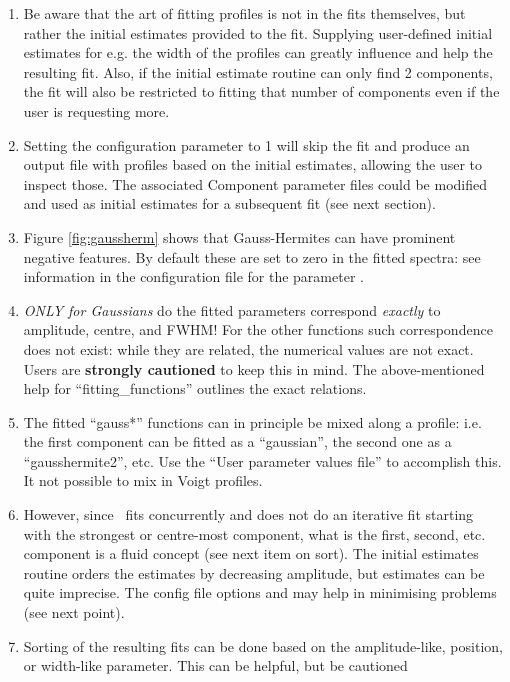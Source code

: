 \documentclass[oneside,11pt]{starlink}
\begin{document}
\begin{enumerate}
\item Be aware that the art of fitting profiles is not in the fits
  themselves, but rather the initial estimates provided to the
  fit. Supplying user-defined initial estimates for e.g. the width of
  the profiles can greatly influence and help the resulting fit. Also, if
  the initial estimate routine can only find 2 components, the fit will
  also be restricted to fitting that number of components even if the
  user is requesting more.
\item Setting the configuration parameter  to 1
  will skip the fit and produce an output file with profiles based on the
  initial estimates, allowing the user to inspect those. The associated
  Component parameter files could be modified and used as initial estimates
  for a subsequent fit (see next section).
\item Figure \ref{fig:gaussherm} shows that Gauss-Hermites can have
  prominent negative features. By default these are set to zero in the
  fitted spectra: see information in the configuration file for the
  parameter .
\item \emph{ONLY for Gaussians} do the fitted parameters correspond
  \emph{exactly} to amplitude, centre, and FWHM! For the other functions
  such correspondence does not exist: while they are related, the
  numerical values are not exact. Users are \textbf{strongly cautioned} to
  keep this in mind. The above-mentioned help for ``fitting\_functions''
  outlines the exact relations.
\item The fitted ``gauss*'' functions can in principle be mixed along a
  profile: i.e. the first component can be fitted as a ``gaussian'', the
  second one as a ``gausshermite2'', etc. Use the 
  ``User parameter values file'' to accomplish this. It not possible to
  mix in Voigt profiles.
\item However, since \fitdd\ fits concurrently and does not do an
  iterative fit starting with the strongest or centre-most component,
  what is the first, second, etc. component is a fluid concept
  (see next item on sort).  The initial estimates routine orders the
  estimates by decreasing amplitude, but estimates can be quite imprecise.
  The config file options  and 
  may help in minimising problems (see next point).
\item Sorting of the resulting fits can be done based on the amplitude-like,
  position, or width-like parameter. This can be helpful, but be cautioned

\end{enumerate}
\end{document}

